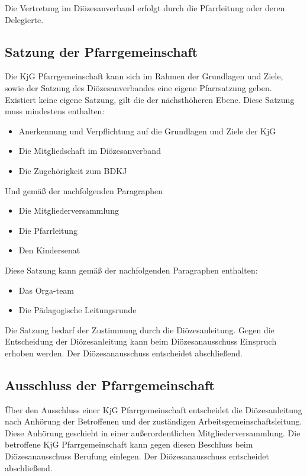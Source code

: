 \documentclass[12pt]{report}
\begin{document}
\begin{flushleft}
Die Vertretung im Diözesanverband erfolgt durch die Pfarrleitung oder deren Delegierte.
\subsection{Satzung der Pfarrgemeinschaft}
Die KjG Pfarrgemeinschaft kann sich im Rahmen der Grundlagen und Ziele, sowie der Satzung
des Diözesanverbandes eine eigene Pfarrsatzung geben. Existiert keine eigene Satzung, gilt die
der nächsthöheren Ebene. Diese Satzung muss mindestens enthalten:
\begin{itemize}
  \item Anerkennung und Verpflichtung auf die Grundlagen und Ziele der KjG
  \item Die Mitgliedschaft im Diözesanverband
  \item Die Zugehörigkeit zum BDKJ
\end{itemize}

Und gemäß der nachfolgenden Paragraphen
\begin{itemize}
  \item Die Mitgliederversammlung
  \item Die Pfarrleitung
  \item Den Kindersenat
\end{itemize}

Diese Satzung kann gemäß der nachfolgenden Paragraphen enthalten:
\begin{itemize}
  \item Das Orga-team
  \item Die Pädagogische Leitungsrunde
\end{itemize}

Die Satzung bedarf der Zustimmung durch die Diözesanleitung.\newline
Gegen die Entscheidung der Diözesanleitung kann beim Diözesanausschuss Einspruch erhoben
werden. Der Diözesanausschuss entscheidet abschließend.
\subsection{Ausschluss der Pfarrgemeinschaft}
Über den Ausschluss einer KjG Pfarrgemeinschaft entscheidet die Diözesanleitung nach Anhörung
der Betroffenen und der zuständigen Arbeitsgemeinschaftsleitung.
Diese Anhörung geschieht in einer außerordentlichen Mitgliederversammlung. Die betroffene KjG Pfarrgemeinschaft
kann gegen diesen Beschluss beim Diözesanausschuss Berufung einlegen. 
Der Diözesanausschuss entscheidet abschließend.


\end{flushleft}
\end{document}
